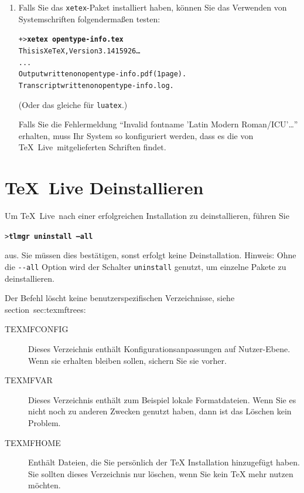 \documentclass[12pt,ngerman,a4paper,fullparskip]{scrreprt}
\newcommand{\TL}{\TeX\ Live\xspace}
\newcommand{\code}[1]{\texttt{#1}}
\newcommand{\filename}[1]{\texttt{#1}}
\newcommand{\Ucom}[1]{\textbf{\texttt{#1}}}
\begin{document}
\begin{enumerate}
\item Falls Sie das \filename{xetex}-Paket installiert haben, können Sie
das Verwenden von Systemschriften folgendermaßen testen:
\begin{alltt}
+> \Ucom{xetex opentype-info.tex}
This is XeTeX, Version 3.1415926\dots
...
Output written on opentype-info.pdf (1 page).
Transcript written on opentype-info.log.
\end{alltt}

(Oder das gleiche für \filename{luatex}.)

Falls Sie die Fehlermeldung \enquote{Invalid fontname 'Latin Modern
Roman/ICU'\dots} erhalten, muss Ihr System so konfiguriert werden, dass
es die von \TL\ mitgelieferten Schriften findet. %
\end{enumerate}

\section{\TL Deinstallieren}
\label{sec:uninstall}

Um \TL\ nach einer erfolgreichen Installation zu deinstallieren, führen Sie

\begin{alltt}
> \Ucom{tlmgr uninstall --all}
\end{alltt}

aus. Sie müssen dies bestätigen, sonst erfolgt keine Deinstallation. Hinweis:
Ohne die \code{-{}-all} Option wird der Schalter \code{uninstall} genutzt, um einzelne Pakete zu deinstallieren.

Der Befehl löscht keine benutzerspezifischen Verzeichnisse, siehe section~{sec:texmftrees}:

\begin{description}
\item [TEXMFCONFIG] Dieses Verzeichnis enthält Konfigurationsanpassungen auf Nutzer-Ebene. Wenn sie erhalten bleiben sollen, sichern Sie sie vorher.

\item [TEXMFVAR] Dieses Verzeichnis enthält zum Beispiel lokale Formatdateien. Wenn Sie es nicht noch zu anderen Zwecken genutzt haben, dann ist das Löschen kein Problem.

\item[TEXMFHOME] Enthält Dateien, die Sie persönlich der TeX Installation hinzugefügt haben. Sie sollten dieses Verzeichnis nur löschen, wenn Sie kein TeX mehr nutzen möchten.

\end{description}
\end{document}
